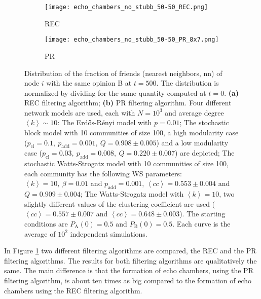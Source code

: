 \documentclass[11 pt , letterpaper , twoside , openright]{book}
\begin{document}
\begin{figure}[H]
  \begin{subfigure}[b]{0.49\textwidth}
    \caption{REC}
  	\texttt{[image: echo\_chambers\_no\_stubb\_50-50\_REC.png]}
      \end{subfigure}
  \begin{subfigure}[b]{0.49\textwidth}
    \caption{PR}
  	\texttt{[image: echo\_chambers\_no\_stubb\_50-50\_PR\_8x7.png]}
  \end{subfigure}
  \captionsetup{format=plain}
  \caption[Distribution of the fraction of friends (nearest neighbors, nn) of node $i$ with the same opinion B at $t=500$, $\left<P_{\text{B}}^{\text{nn}}\right>$, for an initial $50/50$ opinion distribution.]{Distribution of the fraction of friends (nearest neighbors, nn) of node $i$ with the same opinion B at $t = 500$. The distribution is normalized by dividing for the same quantity computed at $t=0$. \textbf{(a)} REC filtering algorithm; \textbf{(b)} PR filtering algorithm. Four different network models are used, each with $N = 10^3$ and average degree $\left<k\right> \sim 10$: The Erd\H{o}s-R\'{e}nyi model with $p = 0.01$; The stochastic block model with 10 communities of size 100, a high modularity case ($p_{\text{cl}} = 0.1,\ p_{\text{add}} = 0.001,\ Q = 0.908 \pm 0.005$) and a low modularity case ($p_{\text{cl}} = 0.03,\ p_{\text{add}} = 0.008,\ Q = 0.220 \pm 0.007$) are depicted; The stochastic Watts-Strogatz model with 10 communities of size 100, each community has the following WS parameters: $\left<k\right> = 10,\ \beta = 0.01$ and $p_{\text{add}} = 0.001$, $\left<cc\right> = 0.553 \pm 0.004$ and $Q = 0.909 \pm 0.004$; The Watts-Strogatz model with $\left<k\right> = 10$, two slightly different values of the clustering coefficient are used ($\left<cc\right> = 0.557 \pm 0.007$ and $\left<cc\right> = 0.648 \pm 0.003$). The starting conditions are $P_{\text{A}}(0) = 0.5$ and $P_{\text{B}}(0) = 0.5$. Each curve is the average of $10^2$ independent simulations.}
\label{echo_50_50}
\end{figure}
\noindent
In Figure \ref{echo_50_50} two different filtering algorithms are compared, the REC and the PR filtering algorithms. The results for both filtering algorithms are qualitatively the same. The main difference is that the formation of echo chambers, using the PR filtering algorithm, is about ten times as big compared to the formation of echo chambers using the REC filtering algorithm. \\
\newline
\end{document}
